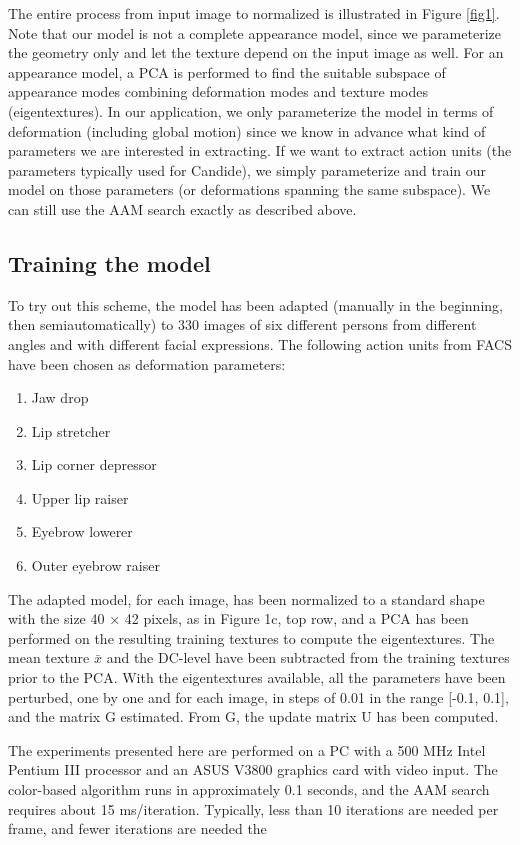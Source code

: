 \documentclass[12pt]{spieman}
\begin{document}
\begin{spacing}{2}
The entire process from input image to normalized is illustrated in Figure \ref{fig1}. Note that our model is not a complete appearance model, since we parameterize the geometry only and let the texture depend on the input image as well. For an appearance model, a PCA is performed to find the suitable subspace of appearance modes combining deformation modes and texture modes (eigentextures). In our application, we only parameterize the model in terms of deformation (including global motion) since we know in advance what kind of parameters we are interested in extracting. If we want to extract action units (the parameters typically used for Candide), we simply parameterize and train our model on those parameters (or deformations spanning the same subspace). We can still use the AAM search exactly as described above.

\subsection{Training the model}

To try out this scheme, the model has been adapted (manually in the beginning, then semiautomatically) to 330 images of six different persons from different angles and with different facial expressions. The following action units from FACS have been chosen as deformation parameters:


\begin{enumerate}
    \item Jaw drop
    \item Lip stretcher
    \item Lip corner depressor
    \item Upper lip raiser
    \item Eyebrow lowerer
    \item Outer eyebrow raiser
\end{enumerate}
The adapted model, for each image, has been normalized to a standard shape with the size 40 × 42 pixels, as in Figure 1c, top row, and a PCA has been performed on the resulting training textures to compute the eigentextures. The mean texture $\bar{x}$ and the DC-level have been subtracted from the training textures prior to the PCA. With the eigentextures available, all the parameters have been perturbed, one by one and for each image, in steps of 0.01 in the range [-0.1, 0.1], and the matrix G estimated. From G, the update matrix U has been computed.

The experiments presented here are performed on a PC with a 500 MHz Intel Pentium III processor and an ASUS V3800 graphics card with video input. The color-based algorithm runs in approximately 0.1 seconds, and the AAM search requires about 15 ms/iteration. Typically, less than 10 iterations are needed per frame, and fewer iterations are needed the



\end{spacing}
\end{document}
